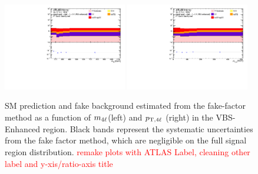 \begin{figure}[htb]
    \centering
    \includegraphics[width=0.48\textwidth]{figures/Analysis/Background/RedStack_VBSEnhanced_M4l.pdf}
    \includegraphics[width=0.48\textwidth]{figures/Analysis/Background/RedStack_VBSEnhanced_Pt4l.pdf}
    \caption{ SM prediction and fake background estimated from the fake-factor method as a function of $m_{4\ell}$(left) and $p_{\textrm{T} ,4\ell}$ (right) in the VBS-Enhanced region. Black bands represent the systematic uncertainties from the fake factor method, which are negligible on the full signal region distribution. \textcolor{red}{remake plots with ATLAS Label, cleaning other label and y-xis/ratio-axis title} \label{fig:MCFFRedStack} }
\end{figure}